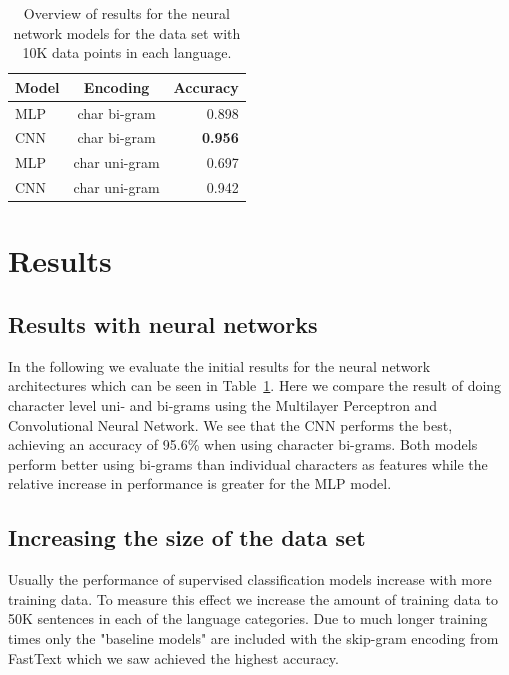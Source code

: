 
\begin{table}
  \centering
  \begin{tabular}{ l | c | r }
    \hline
    Model               & Encoding  & Accuracy \\
    \hline
    MLP                 & char bi-gram &  0.898 \\
    CNN                 & char bi-gram & \textbf{0.956} \\
    MLP                 & char uni-gram &  0.697\\
    CNN                 & char uni-gram  & 0.942 \\
    \hline
  \end{tabular}
  \caption{Overview of results for the neural network models for the data set with 10K data points in each language.}
  \label{keras-results}
\end{table}

\section{Results}

\subsection{Results with neural networks}
In the following we evaluate the initial results for the neural network architectures which can be seen in Table~\ref{keras-results}. Here we compare the result of doing character level uni- and bi-grams using the Multilayer Perceptron and Convolutional Neural Network. We see that the CNN performs the best, achieving an accuracy of 95.6\% when using character bi-grams. Both models perform better using bi-grams than individual characters as features while the relative increase in performance is greater for the MLP model.


\subsection{Increasing the size of the data set}
Usually the performance of supervised classification models increase with more training data. To measure this effect we increase the amount of training data to 50K sentences in each of the language categories. Due to much longer training times only the "baseline models" are included with the skip-gram encoding from FastText which we saw achieved the highest accuracy. 

